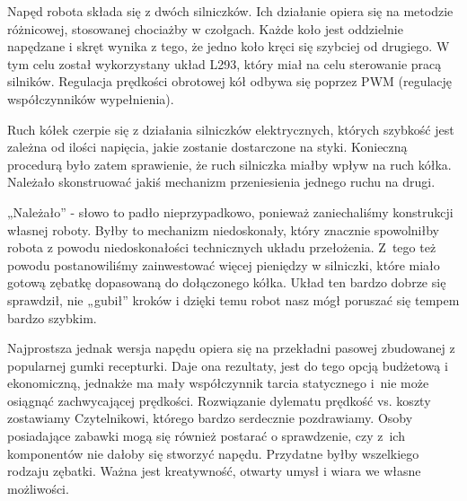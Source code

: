 Napęd robota składa się z dwóch silniczków. Ich działanie opiera się na metodzie różnicowej, stosowanej chociażby w czołgach. Każde koło jest oddzielnie napędzane i skręt wynika z tego, że jedno koło kręci się szybciej od drugiego. W tym celu został wykorzystany układ L293, który miał na celu sterowanie pracą silników. Regulacja prędkości obrotowej kół odbywa się poprzez PWM (regulację współczynników wypełnienia).

Ruch kółek czerpie się z działania silniczków elektrycznych, których szybkość jest zależna od ilości napięcia, jakie zostanie dostarczone na styki. Konieczną procedurą było zatem sprawienie, że ruch silniczka miałby wpływ na ruch kółka. Należało skonstruować jakiś mechanizm przeniesienia jednego ruchu na drugi. 

„Należało” - słowo to padło nieprzypadkowo, ponieważ zaniechaliśmy konstrukcji własnej roboty. Byłby to mechanizm niedoskonały, który znacznie spowolniłby robota z powodu niedoskonałości technicznych układu przełożenia. Z~tego też powodu postanowiliśmy zainwestować więcej pieniędzy w silniczki, które miało gotową zębatkę dopasowaną do dołączonego kółka. Układ ten bardzo dobrze się sprawdził, nie „gubił” kroków i dzięki temu robot nasz mógł poruszać się tempem bardzo szybkim.

Najprostsza jednak wersja napędu opiera się na przekładni pasowej zbudowanej z popularnej gumki recepturki. Daje ona rezultaty, jest do tego opcją budżetową i ekonomiczną, jednakże ma mały współczynnik tarcia statycznego i~nie może osiągnąć zachwycającej prędkości. Rozwiązanie dylematu prędkość vs. koszty zostawiamy Czytelnikowi, którego bardzo serdecznie pozdrawiamy. Osoby posiadające zabawki mogą się również postarać o sprawdzenie, czy z~ich komponentów nie dałoby się stworzyć napędu. Przydatne byłby wszelkiego rodzaju zębatki. Ważna jest kreatywność, otwarty umysł i wiara we własne możliwości. 


